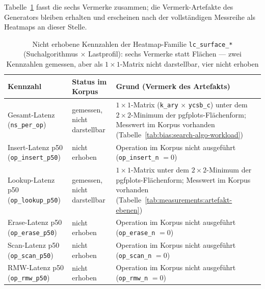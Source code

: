\ifPlatzhalterAlsTabelle%
Tabelle~\ref{tab:t3:surfaces} fasst die sechs Vermerke zusammen; die Vermerk-Artefakte des Generators
bleiben erhalten und erscheinen nach der vollständigen Messreihe als Heatmaps an dieser Stelle.
\begin{table}[!htbp]
\centering
\small
\begin{tabular}{@{}>{\raggedright\arraybackslash}p{4.4cm}>{\raggedright\arraybackslash}p{3.0cm}>{\raggedright\arraybackslash}p{7.0cm}@{}}
\toprule
Kennzahl & Status im Korpus & Grund (Vermerk des Artefakts) \\
\midrule
Gesamt-Latenz (\texttt{ns\_per\_op}) & gemessen, nicht darstellbar & $1{\times}1$-Matrix (\texttt{k\_ary} $\times$ \texttt{ycsb\_c}) unter dem $2{\times}2$-Minimum der pgfplots-Flächenform; Messwert im Korpus vorhanden (Tabelle~\ref{tab:bias:search-algo-workload}) \\
Insert-Latenz p50 (\texttt{op\_insert\_p50}) & nicht erhoben & Operation im Korpus nicht ausgeführt (\texttt{op\_insert\_n} $= 0$) \\
Lookup-Latenz p50 (\texttt{op\_lookup\_p50}) & gemessen, nicht darstellbar & $1{\times}1$-Matrix unter dem $2{\times}2$-Minimum der pgfplots-Flächenform; Messwert im Korpus vorhanden (Tabelle~\ref{tab:measurements:artefakt-ebenen}) \\
Erase-Latenz p50 (\texttt{op\_erase\_p50}) & nicht erhoben & Operation im Korpus nicht ausgeführt (\texttt{op\_erase\_n} $= 0$) \\
Scan-Latenz p50 (\texttt{op\_scan\_p50}) & nicht erhoben & Operation im Korpus nicht ausgeführt (\texttt{op\_scan\_n} $= 0$) \\
RMW-Latenz p50 (\texttt{op\_rmw\_p50}) & nicht erhoben & Operation im Korpus nicht ausgeführt (\texttt{op\_rmw\_n} $= 0$) \\
\bottomrule
\end{tabular}
\caption{Nicht erhobene Kennzahlen der Heatmap-Familie \texttt{lc\_surface\_*} (Suchalgorithmus $\times$
Lastprofil): sechs Vermerke statt Flächen --- zwei Kennzahlen gemessen, aber als $1{\times}1$-Matrix
nicht darstellbar, vier nicht erhoben}%
\label{tab:t3:surfaces}
\end{table}
\else






\fi

